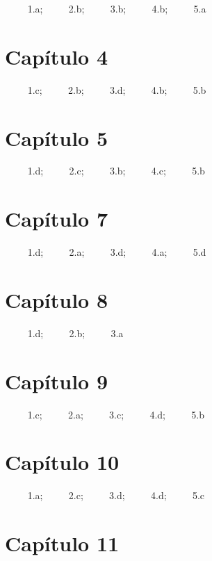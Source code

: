 \documentclass[
]{book}
\begin{document}
\(\qquad\) 1.a; \(\qquad\) 2.b; \(\qquad\) 3.b; \(\qquad\) 4.b; \(\qquad\) 5.a

\hypertarget{capuxedtulo-4}{%
\section{Capítulo 4}\label{capuxedtulo-4}}

\(\qquad\) 1.c; \(\qquad\) 2.b; \(\qquad\) 3.d; \(\qquad\) 4.b; \(\qquad\) 5.b

\hypertarget{capuxedtulo-5}{%
\section{Capítulo 5}\label{capuxedtulo-5}}

\(\qquad\) 1.d; \(\qquad\) 2.c; \(\qquad\) 3.b; \(\qquad\) 4.c; \(\qquad\) 5.b

\hypertarget{capuxedtulo-7}{%
\section{Capítulo 7}\label{capuxedtulo-7}}

\(\qquad\) 1.d; \(\qquad\) 2.a; \(\qquad\) 3.d; \(\qquad\) 4.a; \(\qquad\) 5.d

\hypertarget{capuxedtulo-8}{%
\section{Capítulo 8}\label{capuxedtulo-8}}

\(\qquad\) 1.d; \(\qquad\) 2.b; \(\qquad\) 3.a

\hypertarget{capuxedtulo-9}{%
\section{Capítulo 9}\label{capuxedtulo-9}}

\(\qquad\) 1.c; \(\qquad\) 2.a; \(\qquad\) 3.c; \(\qquad\) 4.d; \(\qquad\) 5.b

\hypertarget{capuxedtulo-10}{%
\section{Capítulo 10}\label{capuxedtulo-10}}

\(\qquad\) 1.a; \(\qquad\) 2.c; \(\qquad\) 3.d; \(\qquad\) 4.d; \(\qquad\) 5.c

\hypertarget{capuxedtulo-11}{%
\section{Capítulo 11}\label{capuxedtulo-11}}
\end{document}
